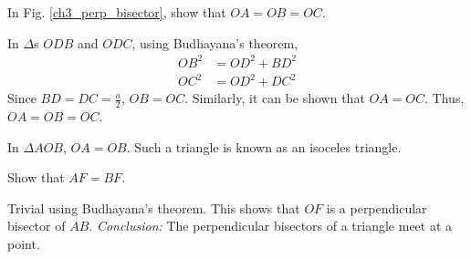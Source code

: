 %
\begin{problem}
	In Fig. \ref{ch3_perp_bisector}, show that $OA=OB=OC$.
\end{problem}
%
\proof In $\Delta$s $ODB$ and $ODC$, using Budhayana's theorem,
%
\begin{equation}
\begin{split}
OB^2 &= OD^2 + BD^2 \\
OC^2 &= OD^2 + DC^2 
\end{split}
\end{equation}
%
Since $BD = DC = \frac{a}{2}$, $OB = OC$.  Similarly, it can be shown that $OA = OC$.  Thus, $OA=OB=OC$.
%
\begin{definition}
	In $\Delta AOB$, $OA = OB$.  Such a triangle is known as an isoceles triangle.
\end{definition}
%
\begin{problem}
	Show that $AF = BF$.
\end{problem}
\proof Trivial using Budhayana's theorem.  This shows that $OF$ is a perpendicular bisector of $AB$. 
{\em Conclusion:}  The perpendicular bisectors of a triangle meet at a point.
%
